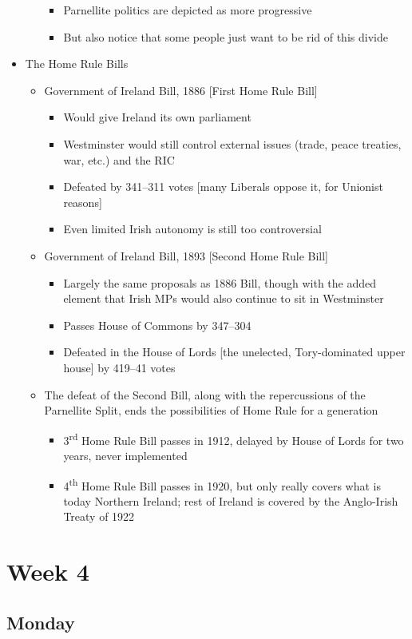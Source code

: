 \documentclass[12pt]{article}
\def\th{\textsuperscript{th}}
\begin{document}
\begin{itemize}
\begin{itemize}
\begin{itemize}
                        \item Parnellite politics are depicted as more progressive
                        \item But also notice that some people just want to be rid of this divide
                    \end{itemize}
                \end{itemize}
                \item The Home Rule Bills
                \begin{itemize}
                    \item Government of Ireland Bill, 1886 [First Home Rule Bill]
                    \begin{itemize}
                        \item Would give Ireland its own parliament
                        \item Westminster would still control external issues (trade, peace treaties, war, etc.) and the RIC
                        \item Defeated by 341--311 votes [many Liberals oppose it, for Unionist reasons]
                        \item Even limited Irish autonomy is still too controversial
                    \end{itemize}
                    \item Government of Ireland Bill, 1893 [Second Home Rule Bill]
                    \begin{itemize}
                        \item Largely the same proposals as 1886 Bill, though with the added element that Irish MPs would also continue to sit in Westminster
                        \item Passes House of Commons by 347--304
                        \item Defeated in the House of Lords [the unelected, Tory-dominated upper house] by 419--41 votes
                    \end{itemize}
                    \item The defeat of the Second Bill, along with the repercussions of the Parnellite Split, ends the possibilities of Home Rule for a generation
                    \begin{itemize}
                        \item 3\textsuperscript{rd} Home Rule Bill passes in 1912, delayed by House of Lords for two years, never implemented
                        \item 4\th{} Home Rule Bill passes in 1920, but only really covers what is today Northern Ireland; rest of Ireland is covered by the Anglo-Irish Treaty of 1922
                    \end{itemize}
                \end{itemize}
            \end{itemize}
            \newpage
    \section{Week 4}
        \subsection{Monday}
\end{document}
